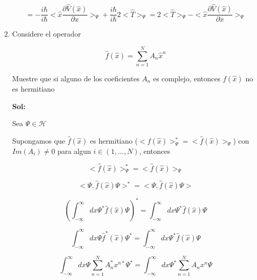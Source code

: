 \documentclass[12pt,a4paper]{article}
\begin{document}
\begin{enumerate}
    \begin{equation*}
        = -\frac{i\hbar}{i\hbar} <\hat{x} \frac{\partial \hat{V}(\hat{x})}{\partial x}>_\Psi + \frac{i\hbar}{i \hbar} 2<\hat{T}>_\Psi= 2<\hat{T}>_\Psi - <\hat{x} \frac{\partial \hat{V}(\hat{x})}{\partial x}>_\Psi
    \end{equation*}
    
    
    
    
    
    
    
    \item Considere el operador
    
    \begin{equation*}
        \hat{f}(\hat{x}) = \sum_{n=1}^{N} A_n \hat{x}^n
    \end{equation*}
    
    Muestre que si alguno de los coeficientes $A_n$ es complejo, entonces $f(\hat{x})$ no es hermitiano
    
    \textbf{Sol:}
    
    Sea $\Psi \in \mathcal{H}$
    
    Supongamos que $\hat{f}(\hat{x})$ es hermitiano ($<\hat{f}(\hat{x})>_\Psi^*=<\hat{f}(\hat{x})>_\Psi$) con $Im(A_i) \neq 0$ para algun $i \in (1, ... , N)$, entonces
    
    \begin{equation*}
        <\hat{f}(\hat{x})>_\Psi^*=<\hat{f}(\hat{x})>_\Psi
    \end{equation*}
    
    \begin{equation*}
        <\Psi,\hat{f}(\hat{x}) \Psi>^* = <\Psi,\hat{f}(\hat{x}) \Psi>
    \end{equation*}
    
    
    \begin{equation*}
        \left(\int_{-\infty}^{\infty}dx \Psi^* \hat{f}(\hat{x}) \Psi \right)^* = \int_{-\infty}^{\infty}dx \Psi^* \hat{f}(\hat{x}) \Psi
    \end{equation*}
    
    \begin{equation*}
        \int_{-\infty}^{\infty}dx \Psi \hat{f}^*(\hat{x}) \Psi^* = \int_{-\infty}^{\infty}dx \Psi^* \hat{f}(\hat{x}) \Psi
    \end{equation*}
    
    \begin{equation*}
        \int_{-\infty}^{\infty}dx \Psi \sum_{n=1}^{N}A_n^* x^{n*} \Psi^* = \int_{-\infty}^{\infty}dx \Psi^* \sum_{n=1}^{N}A_n x^n \Psi
    \end{equation*}
    

\end{enumerate}
\end{document}
